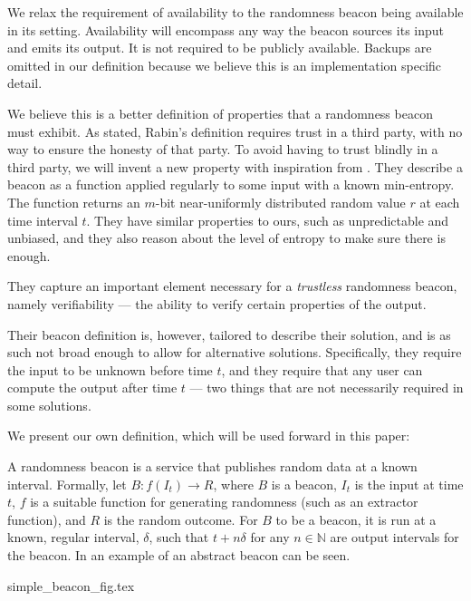 We relax the requirement of availability to the randomness beacon being available in its setting. Availability will encompass any way the beacon sources its input and emits its output. It is not required to be publicly available. Backups are omitted in our definition because we believe this is an implementation specific detail.

We believe this is a better definition of properties that a randomness beacon must exhibit.
As stated, Rabin's definition requires trust in a third party, with no way to ensure the honesty of that party.
To avoid having to trust blindly in a third party, we will invent a new property with inspiration from \citet{bonneau2015bitcoin}.
They describe a beacon as a function applied regularly to some input with a known min-entropy. The function returns an $m$-bit near-uniformly distributed random value $r$ at each time interval $t$. They have similar properties to ours, such as unpredictable and unbiased, and they also reason about the level of entropy to make sure there is enough.

They capture an important element necessary for a \emph{trustless} randomness beacon, namely verifiability --- the ability to verify certain properties of the output.

Their beacon definition is, however, tailored to describe their solution, and is as such not broad enough to allow for alternative solutions.
Specifically, they require the input to be unknown before time $t$, and they require that any user can compute the output after time $t$ --- two things that are not necessarily required in some solutions.

We present our own definition, which will be used forward in this paper:

A randomness beacon is a service that publishes random data at a known interval.
Formally, let $B: f(I_t) \rightarrow R$, where $B$ is a beacon, $I_t$ is the input at time $t$, $f$ is a suitable function for generating randomness (such as an extractor function), and $R$ is the random outcome. %
For $B$ to be a beacon, it is run at a known, regular interval, $\delta$, such that $t+n\delta$ for any $n \in \mathbb{N}$ are output intervals for the beacon.
In  an example of an abstract beacon can be seen.

{simple_beacon_fig.tex}

